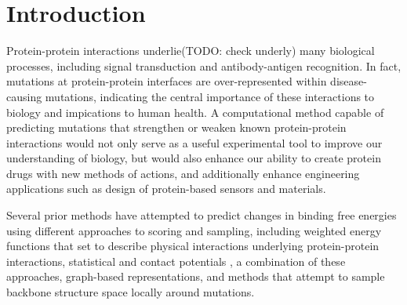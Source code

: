 \section{Introduction}

Protein-protein interactions underlie(TODO: check underly) many biological processes, including signal transduction and antibody-antigen recognition.
In fact, mutations at protein-protein interfaces are over-represented within disease-causing mutations\cite{jubb_mutations_2017}, indicating the central importance of these interactions to biology and impications to human health.
A computational method capable of predicting mutations that strengthen or weaken known protein-protein interactions would not only serve as a useful experimental tool to improve our understanding of biology, but would also enhance our ability to create protein drugs with new methods of actions, and additionally enhance engineering applications such as design of protein-based sensors and materials.

Several prior methods have attempted to predict changes in binding free energies using different approaches to scoring and sampling,
including weighted energy functions that set to describe physical interactions underlying protein-protein interactions\cite{guerois_predicting_2002,kamisetty_accounting_2011},
statistical and contact potentials \cite{dehouck_beatmusic:_2013,moal_intermolecular_2013,vangone_contacts-based_2015,brender_prediction_2015},
a combination of these approaches\cite{li_predicting_2014},
graph-based representations\cite{pires_mcsm:_2014},
and methods that attempt to sample backbone structure space locally around mutations\cite{dourado_multiscale_2014}.


